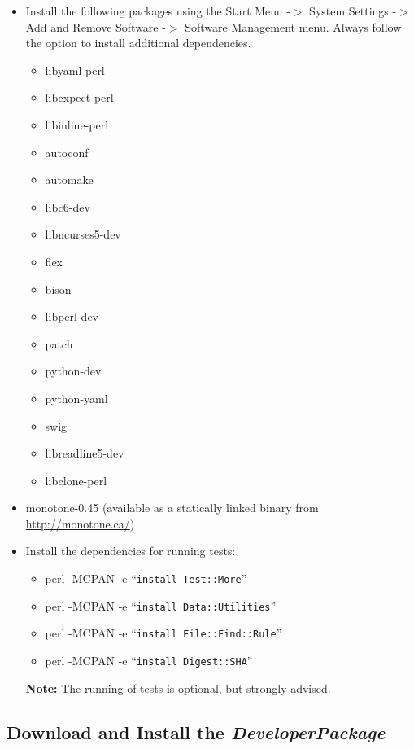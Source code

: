 \documentclass[12pt]{article}
\begin{document}
\begin{itemize}
\item[] Install the following packages using the Start Menu -$>$
  System Settings -$>$ Add and Remove Software -$>$ Software
  Management menu.  Always follow the option to install additional
  dependencies.
      \begin{itemize}
         \item libyaml-perl
         \item libexpect-perl
         \item libinline-perl
         \item autoconf
         \item automake
         \item libc6-dev
         \item libncurses5-dev
         \item flex
         \item bison
         \item libperl-dev
         \item patch
         \item python-dev
         \item python-yaml
         \item swig
         \item libreadline5-dev
         \item libclone-perl
      \end{itemize}
   \item[] monotone-0.45 (available as a statically linked binary from \href{http://monotone.ca/}{http://monotone.ca/})
   \item[] Install the dependencies for running tests:
      \begin{itemize}
         \item perl -MCPAN -e ``{\tt install Test::More}''
         \item perl -MCPAN -e ``{\tt install Data::Utilities}''
         \item perl -MCPAN -e ``{\tt install File::Find::Rule}''
         \item perl -MCPAN -e ``{\tt install Digest::SHA}''
      \end{itemize}   
      {\bf Note:} The running of tests is optional, but strongly advised.
 \end{itemize}

\subsection*{Download and Install the {\it DeveloperPackage}}
\end{document}
